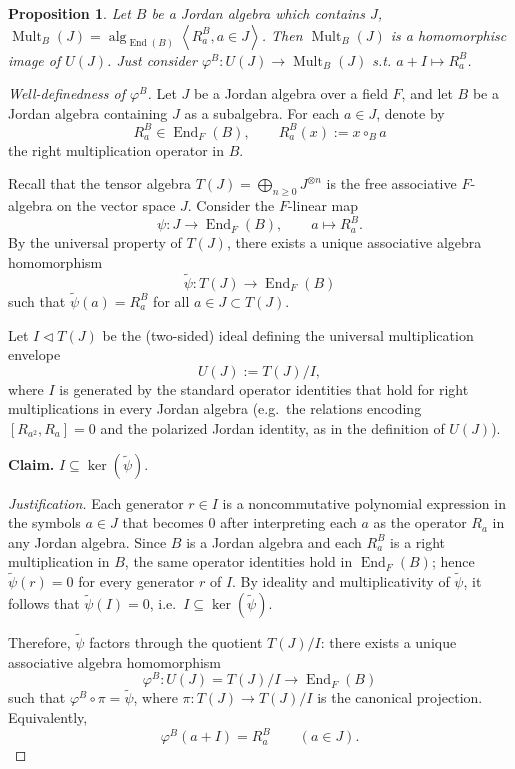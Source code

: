 \documentclass{article}
\newtheorem{proposition}[theorem]{Proposition}
\def\<{\mathop{\langle}}
\def\>{\mathop{\rangle}}
\begin{document}
\begin{proposition}
Let $ B $ be a Jordan algebra which contains $ J $, $ \operatorname{Mult}_B(J)=\operatorname{alg}_{\operatorname{End}(B)}\< R_a^B , a \in J \> $. Then $ \operatorname{Mult}_B(J) $ is a homomorphisc image of $ U(J) $. Just consider $ \varphi^B: U(J) \rightarrow \operatorname{Mult}_B(J) $ s.t. $ a+I \mapsto R_a^B $.
\end{proposition}

\begin{proof}[Well-definedness of $\varphi^B$]
Let $J$ be a Jordan algebra over a field $F$, and let $B$ be a Jordan algebra containing $J$ as a subalgebra.
For each $a\in J$, denote by
\[
R_a^B\in \operatorname{End}_F(B),\qquad R_a^B(x):=x\circ_B a
\]
the right multiplication operator in $B$.

Recall that the tensor algebra $T(J)=\bigoplus_{n\ge 0} J^{\otimes n}$ is the free associative $F$-algebra on the
vector space $J$. Consider the $F$-linear map
\[
\psi:J\longrightarrow \operatorname{End}_F(B),\qquad a\longmapsto R_a^B.
\]
By the universal property of $T(J)$, there exists a unique associative algebra homomorphism
\[
\widetilde{\psi}:T(J)\longrightarrow \operatorname{End}_F(B)
\]
such that $\widetilde{\psi}(a)=R_a^B$ for all $a\in J\subset T(J)$.

Let $I\triangleleft T(J)$ be the (two-sided) ideal defining the universal multiplication envelope
\[
U(J):=T(J)/I,
\]
where $I$ is generated by the standard operator identities that hold for right multiplications
in every Jordan algebra (e.g.\ the relations encoding $[R_{a^2},R_a]=0$ and the polarized
Jordan identity, as in the definition of $U(J)$).

\noindent\textbf{Claim.} $I\subseteq \ker(\widetilde{\psi})$.

\noindent\emph{Justification.}
Each generator $r\in I$ is a noncommutative polynomial expression in the symbols $a\in J$
that becomes $0$ after interpreting each $a$ as the operator $R_a$ in any Jordan algebra.
Since $B$ is a Jordan algebra and each $R_a^B$ is a right multiplication in $B$, the same
operator identities hold in $\operatorname{End}_F(B)$; hence $\widetilde{\psi}(r)=0$ for every generator $r$ of $I$.
By ideality and multiplicativity of $\widetilde{\psi}$, it follows that $\widetilde{\psi}(I)=0$, i.e.\ $I\subseteq \ker(\widetilde{\psi})$.

Therefore, $\widetilde{\psi}$ factors through the quotient $T(J)/I$:
there exists a unique associative algebra homomorphism
\[
\varphi^B:U(J)=T(J)/I\longrightarrow \operatorname{End}_F(B)
\]
such that $\varphi^B\circ \pi=\widetilde{\psi}$, where $\pi:T(J)\to T(J)/I$ is the canonical projection.
Equivalently,
\[
\varphi^B(a+I)=R_a^B\qquad(a\in J).
\]


\end{proof}
\end{document}
